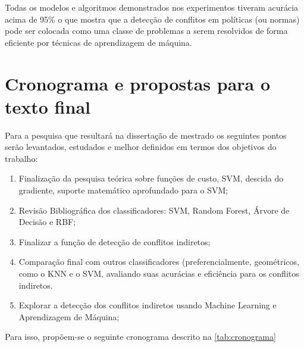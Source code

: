 Todas os modelos e algoritmos demonstrados nos experimentos tiveram acurácia acima de 95\% o que mostra que a detecção de conflitos em políticas (ou normas) pode ser colocada como uma classe de problemas a serem resolvidos de forma eficiente por técnicas de aprendizagem de máquina.
\clearpage
\chapter{Cronograma e propostas para o texto final}\label{propostas}
Para a pesquisa que resultará na dissertação de mestrado os seguintes pontos serão levantados, estudados e melhor definidos em termos dos objetivos do trabalho:
\begin{enumerate}
\item Finalização da pesquisa teórica sobre funções de custo, SVM, descida do gradiente, suporte matemático aprofundado para o SVM;
\item Revisão Bibliográfica dos classificadores: SVM, Random Forest, Árvore de Decisão e RBF;
\item Finalizar a função de detecção de conflitos indiretos;
\item Comparação final com outros classificadores (preferencialmente, geométricos, como o KNN e o SVM, avaliando suas acurácias e eficiência para os conflitos indiretos.
\item Explorar a detecção dos conflitos indiretos usando Machine Learning e Aprendizagem de Máquina;
\end{enumerate}
Para isso, propõem-se o seguinte cronograma descrito na \autoref{tab:cronograma}
